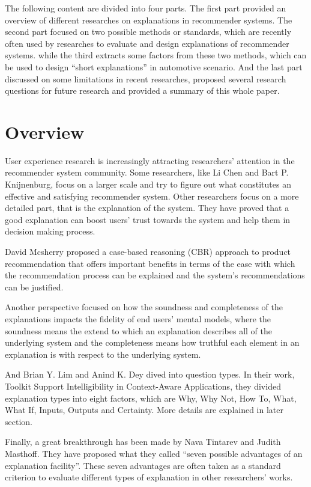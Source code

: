   The following content are divided into four parts. The first part provided an overview of different researches on explanations in recommender systems. 
  The second part focused on two possible methods or standards, which are recently often used by researches to evaluate and design explanations of recommender systems.
  while the third extracts some factors from these two methods, which can be used to design ``short explanations'' in automotive scenario.
  And the last part discussed on some limitations in recent researches, proposed several research questions for future research and provided
  a summary of this whole paper.

\section{Overview}

    \indent 
    User experience research is increasingly attracting researchers’ attention in the recommender system community. 
    Some researchers, like Li Chen\cite{pu2011user} and Bart P. Knijnenburg\cite{knijnenburg2012explaining}, focus on a larger scale and try to figure out what constitutes an effective and satisfying recommender system.
    Other researchers focus on a more detailed part, that is the explanation of the system. They have proved that
    a good explanation can boost users' trust towards the system and help them in decision making process\cite{tintarev2007survey}\cite{van2004designing}\cite{pu2007trust}.

    \indent David Mcsherry proposed a case-based reasoning (CBR) approach\cite{mcsherry2005explanation} to product recommendation
    that offers important benefits in terms of the ease with which the recommendation process can be explained and the system\rq s recommendations can be justified.

    \indent Another perspective focused on how the soundness and completeness of the explanations impacts the fidelity of end users' mental models\cite{kulesza2013too},
    where the soundness means the extend to which an explanation describes all of the underlying system
    and the completeness means how truthful each element in an explanation is with respect to the underlying system.

    \indent And Brian Y. Lim and Anind K. Dey dived into question types. In their work, Toolkit Support Intelligibility in Context-Aware Applications\cite{lim2010toolkit}, they
    divided explanation types into eight factors, which are Why, Why Not, How To, What, What If, Inputs, Outputs and Certainty. More details are explained in later section.
    
    \indent Finally, a great breakthrough has been made by Nava Tintarev and Judith Masthoff.
    They have proposed what they called ``seven possible advantages of an explanation facility''\cite{tintarev2007survey}.
    These seven advantages are often taken as a standard criterion to evaluate different types of explanation in other researchers' works.

